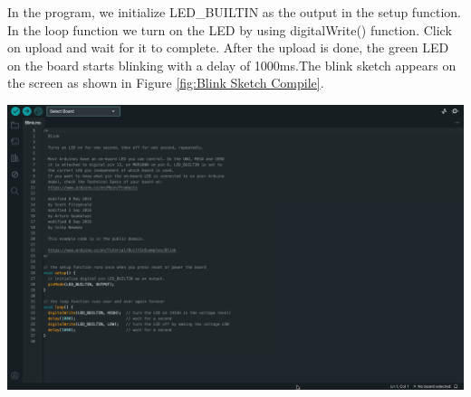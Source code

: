 	
	In the program, we initialize LED\_BUILTIN as the output in the setup function. In the loop function we turn on the LED by using digitalWrite() function. Click on upload and wait for it to complete. After the upload is done, the green LED on the board starts blinking with a delay of 1000ms.The blink sketch appears on the screen as shown in Figure \ref{fig:Blink Sketch Compile}.
	
		\begin{center}
		\label{fig:Blink Sketch Compile}
		\includegraphics[width=0.7\linewidth]{images/ArduinoIDE/CompileBlinkSketch.png}
		\end{center}